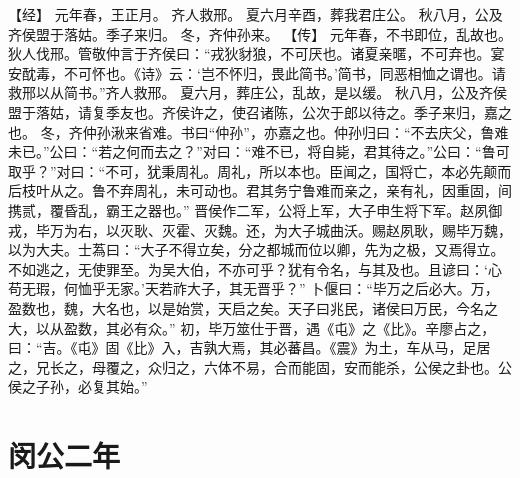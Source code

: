 \documentclass[a4paper,12pt,UTF8,twoside]{ctexbook}
\begin{document}
【经】
元年春，王正月。
齐人救邢。
夏六月辛酉，葬我君庄公。
秋八月，公及齐侯盟于落姑。季子来归。
冬，齐仲孙来。
【传】
元年春，不书即位，乱故也。
狄人伐邢。管敬仲言于齐侯曰：“戎狄豺狼，不可厌也。诸夏亲暱，不可弃也。宴安酖毒，不可怀也。《诗》云：‘岂不怀归，畏此简书。’简书，同恶相恤之谓也。请救邢以从简书。”齐人救邢。
夏六月，葬庄公，乱故，是以缓。
秋八月，公及齐侯盟于落姑，请复季友也。齐侯许之，使召诸陈，公次于郎以待之。季子来归，嘉之也。
冬，齐仲孙湫来省难。书曰“仲孙”，亦嘉之也。仲孙归曰：“不去庆父，鲁难未已。”公曰：“若之何而去之？”对曰：“难不已，将自毙，君其待之。”公曰：“鲁可取乎？”对曰：“不可，犹秉周礼。周礼，所以本也。臣闻之，国将亡，本必先颠而后枝叶从之。鲁不弃周礼，未可动也。君其务宁鲁难而亲之，亲有礼，因重固，间携贰，覆昏乱，霸王之器也。”
晋侯作二军，公将上军，大子申生将下军。赵夙御戎，毕万为右，以灭耿、灭霍、灭魏。还，为大子城曲沃。赐赵夙耿，赐毕万魏，以为大夫。士蒍曰：“大子不得立矣，分之都城而位以卿，先为之极，又焉得立。不如逃之，无使罪至。为吴大伯，不亦可乎？犹有令名，与其及也。且谚曰：‘心苟无瑕，何恤乎无家。’天若祚大子，其无晋乎？”
卜偃曰：“毕万之后必大。万，盈数也，魏，大名也，以是始赏，天启之矣。天子曰兆民，诸侯曰万民，今名之大，以从盈数，其必有众。”
初，毕万筮仕于晋，遇《屯》之《比》。辛廖占之，曰：“吉。《屯》固《比》入，吉孰大焉，其必蕃昌。《震》为土，车从马，足居之，兄长之，母覆之，众归之，六体不易，合而能固，安而能杀，公侯之卦也。公侯之子孙，必复其始。”

\chapter{闵公二年}
\end{document}
